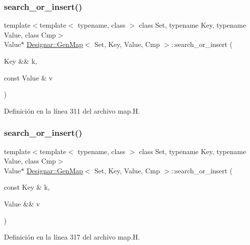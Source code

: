 \subsubsection{\texorpdfstring{search\+\_\+or\+\_\+insert()}{search\_or\_insert()}\hspace{0.1cm}{\footnotesize\ttfamily [2/6]}}
{\footnotesize\ttfamily template$<$template$<$ typename, class $>$ class Set, typename Key, typename Value, class Cmp$>$ \\
Value$\ast$ \hyperlink{class_designar_1_1_gen_map}{Designar\+::\+Gen\+Map}$<$ Set, Key, Value, Cmp $>$\+::search\+\_\+or\+\_\+insert (\begin{DoxyParamCaption}\item[{Key \&\&}]{k,  }\item[{const Value \&}]{v }\end{DoxyParamCaption})\hspace{0.3cm}{\ttfamily [inline]}}



Definición en la línea 311 del archivo map.\+H.

\mbox{\label{class_designar_1_1_gen_map_a17eac83eb57f8181aaaeeda18d155f31}} 
\subsubsection{\texorpdfstring{search\+\_\+or\+\_\+insert()}{search\_or\_insert()}\hspace{0.1cm}{\footnotesize\ttfamily [3/6]}}
{\footnotesize\ttfamily template$<$template$<$ typename, class $>$ class Set, typename Key, typename Value, class Cmp$>$ \\
Value$\ast$ \hyperlink{class_designar_1_1_gen_map}{Designar\+::\+Gen\+Map}$<$ Set, Key, Value, Cmp $>$\+::search\+\_\+or\+\_\+insert (\begin{DoxyParamCaption}\item[{const Key \&}]{k,  }\item[{Value \&\&}]{v }\end{DoxyParamCaption})\hspace{0.3cm}{\ttfamily [inline]}}



Definición en la línea 317 del archivo map.\+H.

